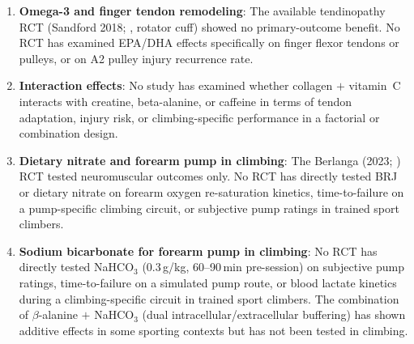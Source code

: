 \begin{enumerate}[noitemsep]
  \item \textbf{Omega-3 and finger tendon remodeling}: The available tendinopathy RCT (Sandford 2018; \cite{SSWL18}, rotator cuff) showed no primary-outcome benefit. No RCT has examined EPA/DHA effects specifically on finger flexor tendons or pulleys, or on A2 pulley injury recurrence rate.

  \item \textbf{Interaction effects}: No study has examined whether collagen $+$ vitamin~C interacts with creatine, beta-alanine, or caffeine in terms of tendon adaptation, injury risk, or climbing-specific performance in a factorial or combination design.

  \item \textbf{Dietary nitrate and forearm pump in climbing}: The Berlanga (2023; \cite{BLSML+23}) RCT tested neuromuscular outcomes only. No RCT has directly tested BRJ or dietary nitrate on forearm oxygen re-saturation kinetics, time-to-failure on a pump-specific climbing circuit, or subjective pump ratings in trained sport climbers.

  \item \textbf{Sodium bicarbonate for forearm pump in climbing}: No RCT has directly tested NaHCO$_3$ (0.3\,g/kg, 60--90\,min pre-session) on subjective pump ratings, time-to-failure on a simulated pump route, or blood lactate kinetics during a climbing-specific circuit in trained sport climbers. The combination of $\beta$-alanine $+$ NaHCO$_3$ (dual intracellular/extracellular buffering) has shown additive effects in some sporting contexts but has not been tested in climbing.

\end{enumerate}
